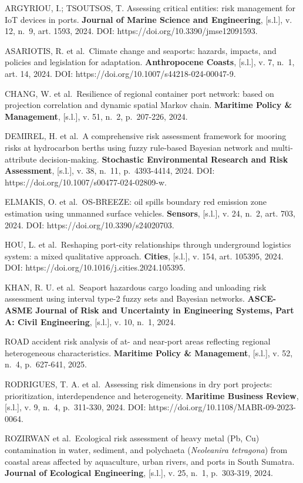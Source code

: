 \documentclass[
  portuguese,
  letterpaper,
  DIV=11,
  numbers=noendperiod]{scrreprt}
\begin{document}
ARGYRIOU, I.; TSOUTSOS, T. Assessing critical entities: risk management
for IoT devices in ports. \textbf{Journal of Marine Science and
Engineering}, {[}s.l.{]}, v. 12, n.~9, art. 1593, 2024. DOI:
https://doi.org/10.3390/jmse12091593.

ASARIOTIS, R. et al.~Climate change and seaports: hazards, impacts, and
policies and legislation for adaptation. \textbf{Anthropocene Coasts},
{[}s.l.{]}, v. 7, n.~1, art. 14, 2024. DOI:
https://doi.org/10.1007/s44218-024-00047-9.

CHANG, W. et al.~Resilience of regional container port network: based on
projection correlation and dynamic spatial Markov chain.
\textbf{Maritime Policy \& Management}, {[}s.l.{]}, v. 51, n.~2,
p.~207-226, 2024.

DEMIREL, H. et al.~A comprehensive risk assessment framework for mooring
risks at hydrocarbon berths using fuzzy rule-based Bayesian network and
multi-attribute decision-making. \textbf{Stochastic Environmental
Research and Risk Assessment}, {[}s.l.{]}, v. 38, n.~11, p.~4393-4414,
2024. DOI: https://doi.org/10.1007/s00477-024-02809-w.

ELMAKIS, O. et al.~OS-BREEZE: oil spills boundary red emission zone
estimation using unmanned surface vehicles. \textbf{Sensors},
{[}s.l.{]}, v. 24, n.~2, art. 703, 2024. DOI:
https://doi.org/10.3390/s24020703.

HOU, L. et al.~Reshaping port-city relationships through underground
logistics system: a mixed qualitative approach. \textbf{Cities},
{[}s.l.{]}, v. 154, art. 105395, 2024. DOI:
https://doi.org/10.1016/j.cities.2024.105395.

KHAN, R. U. et al.~Seaport hazardous cargo loading and unloading risk
assessment using interval type-2 fuzzy sets and Bayesian networks.
\textbf{ASCE-ASME Journal of Risk and Uncertainty in Engineering
Systems, Part A: Civil Engineering}, {[}s.l.{]}, v. 10, n.~1, 2024.

ROAD accident risk analysis of at- and near-port areas reflecting
regional heterogeneous characteristics. \textbf{Maritime Policy \&
Management}, {[}s.l.{]}, v. 52, n.~4, p.~627-641, 2025.

RODRIGUES, T. A. et al.~Assessing risk dimensions in dry port projects:
prioritization, interdependence and heterogeneity. \textbf{Maritime
Business Review}, {[}s.l.{]}, v. 9, n.~4, p.~311-330, 2024. DOI:
https://doi.org/10.1108/MABR-09-2023-0064.

ROZIRWAN et al.~Ecological risk assessment of heavy metal (Pb, Cu)
contamination in water, sediment, and polychaeta (\emph{Neoleanira
tetragona}) from coastal areas affected by aquaculture, urban rivers,
and ports in South Sumatra. \textbf{Journal of Ecological Engineering},
{[}s.l.{]}, v. 25, n.~1, p.~303-319, 2024.
\end{document}
